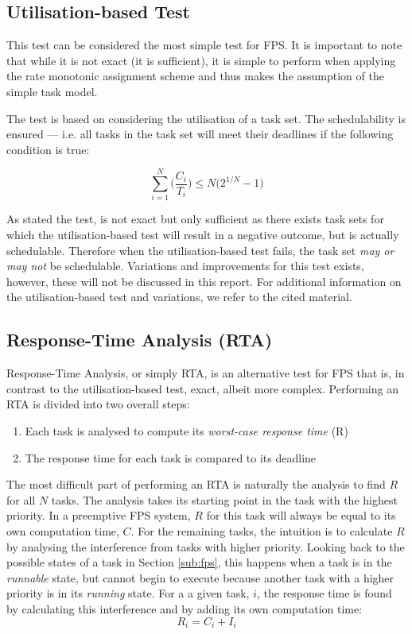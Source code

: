 \subsection{Utilisation-based Test} %
\label{sub:utilization_based_test}
This test can be considered the most simple test for FPS. It is important to note that while it is not exact (it is sufficient), it is simple to perform when applying the rate monotonic assignment scheme and thus makes the assumption of the simple task model.

The test is based on considering the utilisation of a task set. The schedulability is ensured --- i.e. all tasks in the task set will meet their deadlines if the following condition is true:

\begin{equation}
	\sum_{i=1}^N \biggl(\frac{C_i}{T_i}\biggr) \le N\bigl( 2^{1/N} - 1 \bigr)
\end{equation}

As stated the test, is not exact but only sufficient as there exists task sets for which the utilisation-based test will result in a negative outcome, but is actually schedulable. Therefore when the utilisation-based test fails, the task set \textit{may or may not} be schedulable. Variations and improvements for this test exists, however, these will not be discussed in this report. For additional information on the utilisation-based test and variations, we refer to the cited material.


\subsection{Response-Time Analysis (RTA)} %
\label{sub:response_time_analysis_}
Response-Time Analysis, or simply RTA, is an alternative test for FPS that is, in contrast to the utilisation-based test, exact, albeit more complex. Performing an RTA is divided into two overall steps:
\begin{enumerate}
\item Each task is analysed to compute its \textit{worst-case response time} (R)
\item The response time for each task is compared to its deadline
\end{enumerate}
The most difficult part of performing an RTA is naturally the analysis to find $R$ for all $N$ tasks. The analysis takes its starting point in the task with the highest priority. In a preemptive FPS system, $R$ for this task will always be equal to its own computation time, $C$. For the remaining tasks, the intuition is to calculate $R$ by analysing the interference from tasks with higher priority. Looking back to the possible states of a task in Section \ref{sub:fps}, this happens when a task is in the \textit{runnable} state, but cannot begin to execute because another task with a higher priority is in its \textit{running} state. For a a given task, $i$, the response time is found by calculating this interference and by adding its own computation time:
\begin{equation}
	R_i = C_i + I_i
\end{equation}

